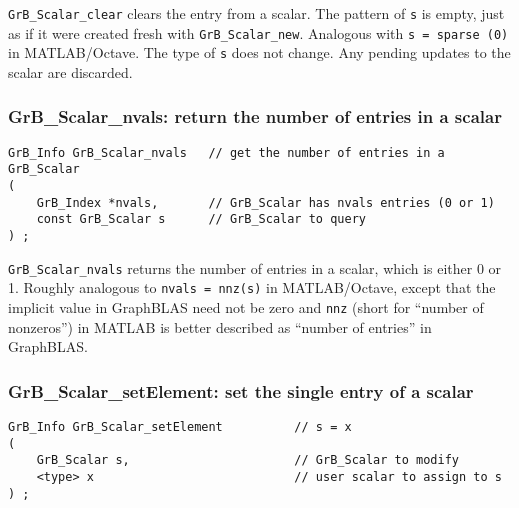 \documentclass[12pt]{article}
\begin{document}
\verb'GrB_Scalar_clear' clears the entry from a scalar.  The pattern of
\verb's' is empty, just as if it were created fresh with \verb'GrB_Scalar_new'.
Analogous with \verb's = sparse (0)' in MATLAB/Octave.  The type of \verb's' does not
change.  Any pending updates to the scalar are discarded.

\newpage
\subsubsection{{\sf GrB\_Scalar\_nvals:} return the number of entries in a scalar}
\label{scalar_nvals}

\begin{mdframed}[userdefinedwidth=6in]
{\footnotesize
\begin{verbatim}
GrB_Info GrB_Scalar_nvals   // get the number of entries in a GrB_Scalar
(
    GrB_Index *nvals,       // GrB_Scalar has nvals entries (0 or 1)
    const GrB_Scalar s      // GrB_Scalar to query
) ;
\end{verbatim}
} \end{mdframed}

\verb'GrB_Scalar_nvals' returns the number of entries in a scalar, which
is either 0 or 1.  Roughly analogous to \verb'nvals = nnz(s)' in MATLAB/Octave,
except that the implicit value in GraphBLAS need not be zero and \verb'nnz'
(short for ``number of nonzeros'') in MATLAB is better described as ``number of
entries'' in GraphBLAS.

\subsubsection{{\sf GrB\_Scalar\_setElement:} set the single entry of a scalar}
\label{scalar_setElement}

\begin{mdframed}[userdefinedwidth=6in]
{\footnotesize
\begin{verbatim}
GrB_Info GrB_Scalar_setElement          // s = x
(
    GrB_Scalar s,                       // GrB_Scalar to modify
    <type> x                            // user scalar to assign to s
) ;
\end{verbatim} } \end{mdframed}
\end{document}

